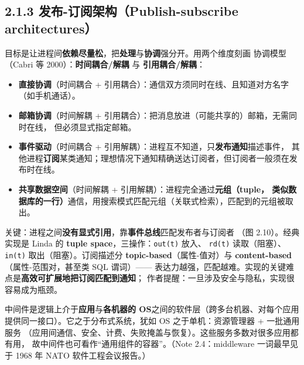 \subsection*{2.1.3 发布-订阅架构（Publish-subscribe architectures）}
目标是让进程间\textbf{依赖尽量松}，把\textbf{处理}与\textbf{协调}强分开。用两个维度刻画
协调模型（Cabri 等 2000）：\textbf{时间耦合/解耦} 与 \textbf{引用耦合/解耦}：

\begin{itemize}
  \item \textbf{直接协调}（时间耦合 + 引用耦合）：通信双方须同时在线、且知道对方名字（如手机通话）。
  \item \textbf{邮箱协调}（时间解耦 + 引用耦合）：把消息放进（可能共享的）邮箱，无需同时在线，
        但必须显式指定邮箱。
  \item \textbf{事件驱动}（时间耦合 + 引用解耦）：进程互不知道，只\textbf{发布通知}描述事件，
        其他进程\textbf{订阅}某类通知；理想情况下通知精确送达订阅者，但订阅者一般须在发布时在线。
  \item \textbf{共享数据空间}（时间解耦 + 引用解耦）：进程完全通过\textbf{元组（tuple，
        类似数据库的一行）}通信，用搜索模式匹配元组（关联式检索），匹配到的元组被取出。
\end{itemize}

\noindent 关键：进程之间\textbf{没有显式引用}，靠\textbf{事件总线}匹配发布者与订阅者
（图 2.10）。经典实现是 Linda 的 \textbf{tuple space}，三操作：\texttt{out(t)} 放入、
\texttt{rd(t)} 读取（阻塞）、\texttt{in(t)} 取出（阻塞）。订阅描述分
\textbf{topic-based}（属性-值对）与 \textbf{content-based}（属性-范围对，甚至类 SQL 谓词）——
表达力越强，匹配越难。实现的关键难点是\textbf{高效可扩展地把订阅匹配到通知}；
作者提醒：一旦涉及安全与隐私，实现很容易成为瓶颈。

\begin{closeread}
\end{closeread}



中间件是逻辑上介于\textbf{应用}与\textbf{各机器的 OS}之间的软件层（跨多台机器、对每个应用
提供同一接口）。它之于分布式系统，犹如 OS 之于单机：资源管理器 + 一批通用服务
（应用间通信、安全、计费、失败掩盖与恢复）。这些服务多数对很多应用都有用，
故中间件也可看作“通用组件的容器”。（Note 2.4：middleware 一词最早见于 1968 年
NATO 软件工程会议报告。）

